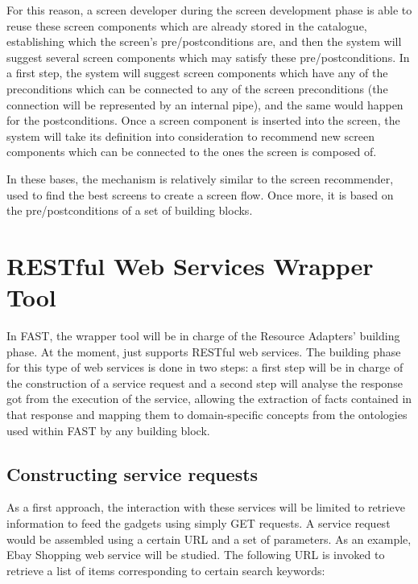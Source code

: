 \documentclass{fast_latex}
\begin{document}
For this reason, a screen developer during the screen development phase is able to reuse these screen components which are already stored in the catalogue, establishing which the screen's pre/postconditions are, and then the system will suggest several screen components which may satisfy these pre/postconditions. In a first step, the system will suggest screen components which have any of the preconditions which can be connected to any of the screen preconditions (the connection will be represented by an internal pipe), and the same would happen for the postconditions. Once a screen component is inserted into the screen, the system will take its definition into consideration to recommend new screen components which can be connected to the ones the screen is composed of.

In these bases, the mechanism is relatively similar to the screen recommender, used to find the best screens to create a screen flow. Once more, it is based on the pre/postconditions of a set of building blocks.



\clearpage
\section{RESTful Web Services Wrapper Tool} %
\label{sec:restful_web_services_wrapper_tool}

In FAST, the wrapper tool will be in charge of the Resource Adapters' building phase. At the moment, just supports RESTful web services. The building phase for this type of web services is done in two steps: a first step will be in charge of the construction of a service request and a second step will analyse the response got from the execution of the service, allowing the extraction of facts contained in that response and mapping them to domain-specific concepts from the ontologies used within FAST by any building block.

\subsection{Constructing service requests} %
\label{sub:constructing_service_requests}

As a first approach, the interaction with these services will be limited to retrieve information to feed the gadgets using simply GET requests. A service request would be assembled using a certain URL and a set of parameters. As an example, Ebay Shopping web service will be studied. The following URL is invoked to retrieve a list of items corresponding to certain search keywords:
\end{document}
